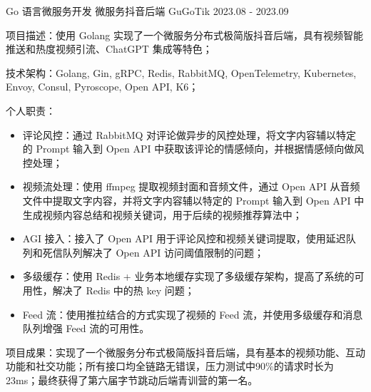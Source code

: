 

\begin{cventries}

  \cventry
    {Go 语言微服务开发} %
    {微服务抖音后端 GuGoTik} %
    {2023.08 - 2023.09} %
    {} %
    {
      \begin{cvitems} %
        \item {项目描述：使用 Golang 实现了一个微服务分布式极简版抖音后端，具有视频智能推送和热度视频引流、ChatGPT 集成等特色；}
        \item {技术架构：Golang, Gin, gRPC, Redis, RabbitMQ, OpenTelemetry, Kubernetes, Envoy, Consul, Pyroscope, Open API, K6；}
        \item {个人职责：}
          \begin{itemize}
            \item {评论风控：通过 RabbitMQ 对评论做异步的风控处理，将文字内容辅以特定的 Prompt 输入到 Open API 中获取该评论的情感倾向，并根据情感倾向做风控处理；}
            \item {视频流处理：使用 ffmpeg 提取视频封面和音频文件，通过 Open API 从音频文件中提取文字内容，并将文字内容辅以特定的 Prompt 输入到 Open API 中生成视频内容总结和视频关键词，用于后续的视频推荐算法中；}
            \item {AGI 接入：接入了 Open API 用于评论风控和视频关键词提取，使用延迟队列和死信队列解决了 Open API 访问阈值限制的问题；}
            \item {多级缓存：使用 Redis + 业务本地缓存实现了多级缓存架构，提高了系统的可用性，解决了 Redis 中的热 key 问题；}
            \item {Feed 流：使用推拉结合的方式实现了视频的 Feed 流，并使用多级缓存和消息队列增强 Feed 流的可用性。}
          \end{itemize}
        \item {项目成果：实现了一个微服务分布式极简版抖音后端，具有基本的视频功能、互动功能和社交功能；所有接口均全链路无错误，压力测试中90\%的请求时长为 23ms；最终获得了第六届字节跳动后端青训营的第一名。}
      \end{cvitems}
    }


\end{cventries}
